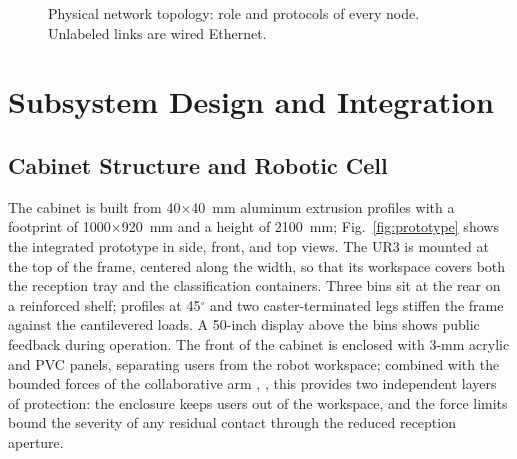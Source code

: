 \documentclass[conference]{IEEEtran}
\begin{document}
\begin{figure}[!t]
\caption{Physical network topology: role and protocols of every node. Unlabeled links are wired Ethernet.}
\label{fig:topology}
\end{figure}

\section{Subsystem Design and Integration}
\subsection{Cabinet Structure and Robotic Cell}
The cabinet is built from 40$\times$40~mm aluminum extrusion profiles with a footprint of 1000$\times$920~mm and a height of 2100~mm; Fig.~\ref{fig:prototype} shows the integrated prototype in side, front, and top views. The UR3 is mounted at the top of the frame, centered along the width, so that its workspace covers both the reception tray and the classification containers. Three bins sit at the rear on a reinforced shelf; profiles at 45$^{\circ}$ and two caster-terminated legs stiffen the frame against the cantilevered loads. A 50-inch display above the bins shows public feedback during operation. The front of the cabinet is enclosed with 3-mm acrylic and PVC panels, separating users from the robot workspace; combined with the bounded forces of the collaborative arm \cite{b10}, \cite{b11}, this provides two independent layers of protection: the enclosure keeps users out of the workspace, and the force limits bound the severity of any residual contact through the reduced reception aperture.
\end{document}
